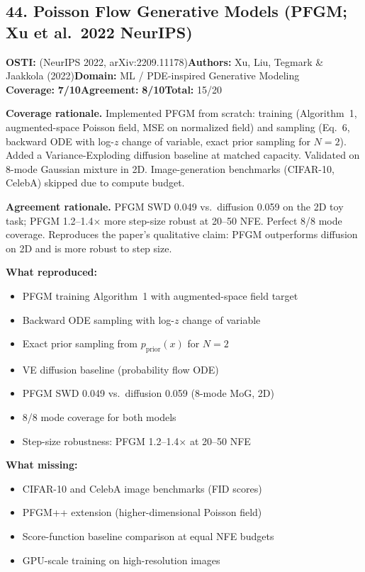 \documentclass[11pt]{article}
\newcommand{\scorebadge}[2]{\textbf{#1:} \textbf{#2/10}}
\begin{document}
\subsection{44. Poisson Flow Generative Models (PFGM; Xu et al.\ 2022 NeurIPS)}
\textbf{OSTI:} (NeurIPS 2022, arXiv:2209.11178)\quad\textbf{Authors:} Xu, Liu, Tegmark \& Jaakkola (2022)\quad\textbf{Domain:} ML / PDE-inspired Generative Modeling\\
\scorebadge{Coverage}{7}\quad\scorebadge{Agreement}{8}\quad\textbf{Total:} 15/20\par\smallskip
\noindent\textbf{Coverage rationale.} Implemented PFGM from scratch: training (Algorithm~1, augmented-space Poisson field, MSE on normalized field) and sampling (Eq.~6, backward ODE with log-$z$ change of variable, exact prior sampling for $N=2$). Added a Variance-Exploding diffusion baseline at matched capacity. Validated on 8-mode Gaussian mixture in 2D. Image-generation benchmarks (CIFAR-10, CelebA) skipped due to compute budget.\par
\noindent\textbf{Agreement rationale.} PFGM SWD 0.049 vs.\ diffusion 0.059 on the 2D toy task; PFGM 1.2--1.4$\times$ more step-size robust at 20--50 NFE. Perfect 8/8 mode coverage. Reproduces the paper's qualitative claim: PFGM outperforms diffusion on 2D and is more robust to step size.\par\smallskip
\noindent\textbf{What reproduced:}
\begin{itemize}[leftmargin=1.4em,itemsep=0.2em,topsep=0.2em]
\item PFGM training Algorithm~1 with augmented-space field target
\item Backward ODE sampling with log-$z$ change of variable
\item Exact prior sampling from $p_\mathrm{prior}(x)$ for $N=2$
\item VE diffusion baseline (probability flow ODE)
\item PFGM SWD 0.049 vs.\ diffusion 0.059 (8-mode MoG, 2D)
\item 8/8 mode coverage for both models
\item Step-size robustness: PFGM 1.2--1.4$\times$ at 20--50 NFE
\end{itemize}
\noindent\textbf{What missing:}
\begin{itemize}[leftmargin=1.4em,itemsep=0.2em,topsep=0.2em]
\item CIFAR-10 and CelebA image benchmarks (FID scores)
\item PFGM++ extension (higher-dimensional Poisson field)
\item Score-function baseline comparison at equal NFE budgets
\item GPU-scale training on high-resolution images
\end{itemize}
\end{document}
